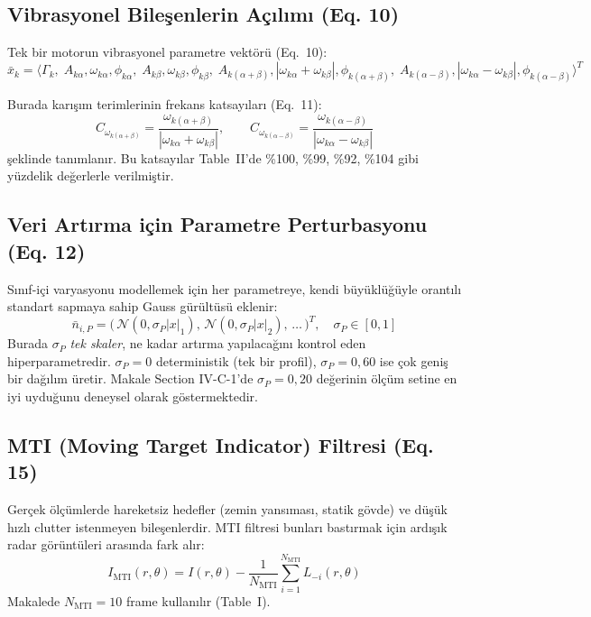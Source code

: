 \documentclass[11pt,a4paper]{article}
\begin{document}
\subsection{Vibrasyonel Bileşenlerin Açılımı (Eq. 10)}
Tek bir motorun vibrasyonel parametre vektörü (Eq.~10):
\begin{equation}
\bar{x}_k = \langle \Gamma_k,\; A_{k\alpha}, \omega_{k\alpha}, \phi_{k\alpha},\;
                              A_{k\beta}, \omega_{k\beta}, \phi_{k\beta},\;
                              A_{k(\alpha+\beta)}, |\omega_{k\alpha}+\omega_{k\beta}|, \phi_{k(\alpha+\beta)},\;
                              A_{k(\alpha-\beta)}, |\omega_{k\alpha}-\omega_{k\beta}|, \phi_{k(\alpha-\beta)} \rangle^T
\label{eq:eq10}
\end{equation}

Burada karışım terimlerinin frekans katsayıları (Eq.~11):
\begin{equation}
C_{\omega_{k(\alpha+\beta)}} = \frac{\omega_{k(\alpha+\beta)}}{|\omega_{k\alpha}+\omega_{k\beta}|}, \qquad
C_{\omega_{k(\alpha-\beta)}} = \frac{\omega_{k(\alpha-\beta)}}{|\omega_{k\alpha}-\omega_{k\beta}|}
\end{equation}
şeklinde tanımlanır. Bu katsayılar Table~II'de \%100, \%99, \%92, \%104 gibi yüzdelik değerlerle
verilmiştir.

\subsection{Veri Artırma için Parametre Perturbasyonu (Eq. 12)}
Sınıf-içi varyasyonu modellemek için her parametreye, kendi büyüklüğüyle orantılı standart sapmaya
sahip Gauss gürültüsü eklenir:
\begin{equation}
\bar{n}_{i,P} = \big(\,\mathcal{N}(0, \sigma_P |x|_1),\,
                    \mathcal{N}(0, \sigma_P |x|_2),\, \ldots\,\big)^T,
                    \quad \sigma_P \in [0,1]
\label{eq:eq12}
\end{equation}
Burada $\sigma_P$ \emph{tek skaler}, ne kadar artırma yapılacağını kontrol eden hiperparametredir.
$\sigma_P=0$ deterministik (tek bir profil), $\sigma_P=0{,}60$ ise çok geniş bir dağılım üretir.
Makale Section IV-C-1'de $\sigma_P=0{,}20$ değerinin ölçüm setine en iyi uyduğunu deneysel olarak
göstermektedir.

\subsection{MTI (Moving Target Indicator) Filtresi (Eq. 15)}
Gerçek ölçümlerde hareketsiz hedefler (zemin yansıması, statik gövde) ve düşük hızlı clutter
istenmeyen bileşenlerdir. MTI filtresi bunları bastırmak için ardışık radar görüntüleri arasında
fark alır:
\begin{equation}
I_{\text{MTI}}(r,\theta) = I(r,\theta) - \frac{1}{N_{\text{MTI}}}\sum_{i=1}^{N_{\text{MTI}}} L_{-i}(r,\theta)
\label{eq:eq15}
\end{equation}
Makalede $N_{\text{MTI}} = 10$ frame kullanılır (Table~I).
\end{document}
